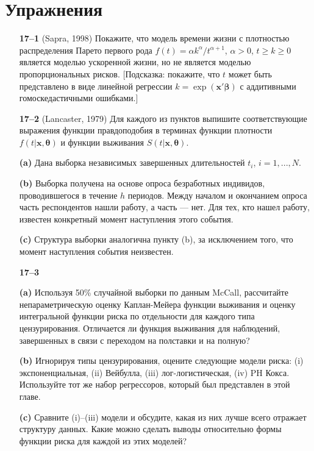 \section{Упражнения}\label{sec:17.ex}
\begin{itemize}

    \item[\textbf{17--1}]
(Sapra, 1998) Покажите, что модель времени жизни с плотностью распределения Парето первого рода $f(t) = \alpha k^\alpha /t^{\alpha + 1}$, $\alpha > 0$, $t \ge k \ge 0$ является моделью ускоренной жизни, но не является моделью пропорциональных рисков. [Подсказка: покажите, что $t$ может быть представлено в виде линейной регрессии $k = \exp(\mathbf{x}'\bm{\beta})$ с аддитивными гомоскедастичными ошибками.]

    \item[\textbf{17--2}] (Lancaster, 1979) Для каждого из пунктов выпишите соответствующие выражения функции правдоподобия в терминах функции плотности $f(t|\mathbf{x},\bm{\theta})$ и функции выживания $S(t|\mathbf{x},\bm{\theta})$.
        \item[\textbf{(a)}] Дана выборка независимых завершенных длительностей $t_i$, $i = 1, ..., N$.
        \item[\textbf{(b)}] Выборка получена на основе опроса безработных индивидов, проводившегося в течение $h$ периодов. Между началом и окончанием опроса часть респондентов нашли работу, а часть --- нет. Для тех, кто нашел работу, известен конкретный момент наступления этого события.
        \item[\textbf{(c)}] Структура выборки аналогична пункту (b), за исключением того, что момент наступления события неизвестен.

    \item[\textbf{17--3}]
        \item[\textbf{(a)}] Используя 50\% случайной выборки по данным McCall, рассчитайте непараметрическую оценку Каплан-Мейера функции выживания и оценку интегральной функции риска по отдельности для каждого типа цензурирования. Отличается ли функция выживания для наблюдений, завершенных в связи с переходом на полставки и на полную?
        \item[\textbf{(b)}] Игнорируя типы цензурирования, оцените следующие модели риска: (i) экспоненциальная, (ii) Вейбулла, (iii) лог-логистическая, (iv) PH Кокса. Используйте тот же набор регрессоров, который был представлен в этой главе.
        \item[\textbf{(c)}] Сравните (i)--(iii) модели и обсудите, какая из них лучше всего отражает структуру данных. Какие можно сделать выводы относительно формы функции риска для каждой из этих моделей?
\end{itemize}

